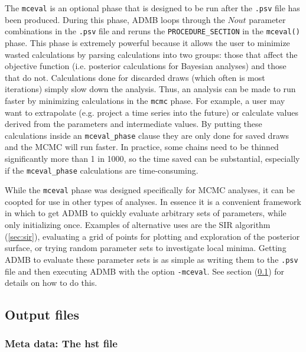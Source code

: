 \documentclass{article}
\begin{document}
The \texttt{mceval} is an optional phase that is designed to
be run after the \texttt{.psv} file has been
produced. During this phase, ADMB loops through the $Nout$
parameter combinations in the \texttt{.psv} file and reruns
the \texttt{PROCEDURE\_SECTION} in the \texttt{mceval()}
phase. This phase is extremely powerful because it allows
the user to minimize wasted calculations by parsing
calculations into two groups: those that affect the
objective function (i.e. posterior calculations for Bayesian
analyses) and those that do not. Calculations done for
discarded draws (which often is most iterations) simply slow
down the analysis. Thus, an analysis can be made to run
faster by minimizing calculations in the \texttt{mcmc}
phase.  For example, a user may want to extrapolate
(e.g. project a time series into the future) or calculate
values derived from the parameters and intermediate
values. By putting these calculations inside an
\texttt{mceval\_phase} clause they are only done for saved
draws and the MCMC will run faster. In practice, some chains
need to be thinned significantly more than 1 in 1000, so the
time saved can be substantial, especially if the
\texttt{mceval\_phase} calculations are time-consuming.

While the \texttt{mceval} phase was designed specifically
for MCMC analyses, it can be coopted for use in other types
of analyses. In essence it is a convenient framework in
which to get ADMB to quickly evaluate arbitrary sets of
parameters, while only initializing once. Examples of
alternative uses are the SIR algorithm (\ref{sec:sir}),
evaluating a grid of points for plotting and exploration of
the posterior surface, or trying random parameter sets to
investigate local minima. Getting ADMB to evaluate these
parameter sets is as simple as writing them to the
\texttt{.psv} file and then executing ADMB with the option
\texttt{-mceval}. See section (\ref{sec:outfiles}) for
details on how to do this.


\subsection{Output files}\label{sec:outfiles}
\subsubsection{Meta data: The hst file}
\end{document}
